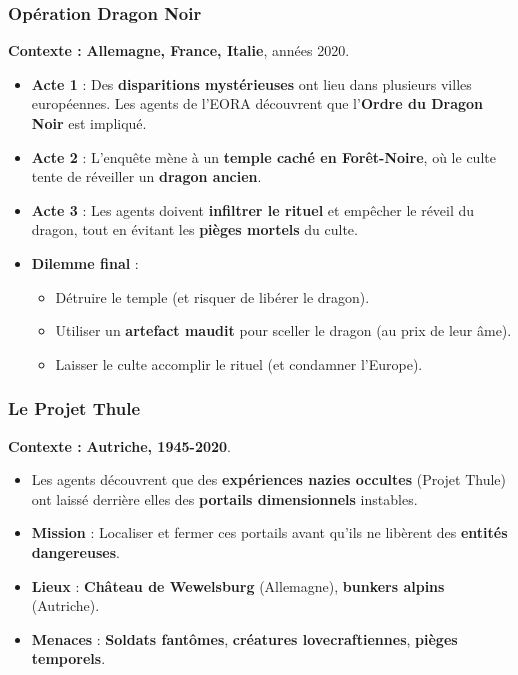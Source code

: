 \documentclass[10pt,a5paper,twoside]{book}
\begin{document}
\subsubsection{Opération Dragon Noir}
\textbf{Contexte :} \textbf{Allemagne, France, Italie}, années 2020.
	\begin{itemize}
		\item \textbf{Acte 1} : Des \textbf{disparitions mystérieuses} ont lieu dans plusieurs villes européennes. Les agents de l'EORA découvrent que l'\textbf{Ordre du Dragon Noir} est impliqué.
		\item \textbf{Acte 2} : L'enquête mène à un \textbf{temple caché en Forêt-Noire}, où le culte tente de réveiller un \textbf{dragon ancien}.
		\item \textbf{Acte 3} : Les agents doivent \textbf{infiltrer le rituel} et empêcher le réveil du dragon, tout en évitant les \textbf{pièges mortels} du culte.
	\item \textbf{Dilemme final} :
	\begin{itemize}
		\item Détruire le temple (et risquer de libérer le dragon).
		\item Utiliser un \textbf{artefact maudit} pour sceller le dragon (au prix de leur âme).
		\item Laisser le culte accomplir le rituel (et condamner l'Europe).
	\end{itemize}
\end{itemize}

\newpage

\subsubsection{Le Projet Thule}
\textbf{Contexte :} \textbf{Autriche, 1945-2020}.
\begin{itemize}
	\item Les agents découvrent que des \textbf{expériences nazies occultes} (Projet Thule) ont laissé derrière elles des \textbf{portails dimensionnels} instables.
	\item \textbf{Mission} : Localiser et fermer ces portails avant qu'ils ne libèrent des \textbf{entités dangereuses}.
	\item \textbf{Lieux} : \textbf{Château de Wewelsburg} (Allemagne), \textbf{bunkers alpins} (Autriche).
	\item \textbf{Menaces} : \textbf{Soldats fantômes}, \textbf{créatures lovecraftiennes}, \textbf{pièges temporels}.
\end{itemize}
\end{document}
